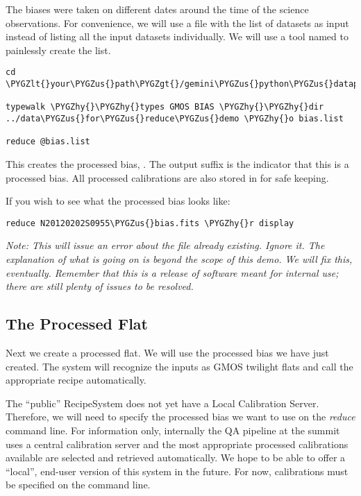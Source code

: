 \documentclass[letterpaper,10pt,english]{sphinxmanual}
\def\PYGZus{\char`\_}
\def\PYGZlt{\char`\<}
\def\PYGZgt{\char`\>}
\def\PYGZhy{\char`\-}
\begin{document}
The biases were taken on different dates
around the time of the science observations.  For convenience, we will use
a file with the list of datasets as input instead of listing all the input
datasets individually.  We will use a tool named  to painlessly
create the list.

\begin{Verbatim}[commandchars=\\\{\}]
cd \PYGZlt{}your\PYGZus{}path\PYGZgt{}/gemini\PYGZus{}python\PYGZus{}datapkg\PYGZhy{}X1/playground

typewalk \PYGZhy{}\PYGZhy{}types GMOS BIAS \PYGZhy{}\PYGZhy{}dir ../data\PYGZus{}for\PYGZus{}reduce\PYGZus{}demo \PYGZhy{}o bias.list

reduce @bias.list
\end{Verbatim}

This creates the processed bias, .  The output suffix
 is the indicator that this is a processed bias.  All processed calibrations
are also stored in  for safe keeping.

If you wish to see what the processed bias looks like:

\begin{Verbatim}[commandchars=\\\{\}]
reduce N20120202S0955\PYGZus{}bias.fits \PYGZhy{}r display
\end{Verbatim}

\emph{Note: This will issue an error about the file already existing.  Ignore it.
The explanation of what is going on is beyond the scope of this demo.  We
will fix this, eventually.  Remember that this is a release of software meant
for internal use; there are still plenty of issues to be resolved.}


\subsection{The Processed Flat}
\label{appendices/appendix_demo:the-processed-flat}
Next we create a processed flat.  We will use the processed bias we have
just created.  The system will recognize the inputs as GMOS twilight flats and
call the appropriate recipe automatically.

The ``public'' RecipeSystem does not yet have a Local Calibration Server.  Therefore,
we will need to specify the processed bias we want to use on the \emph{reduce} command
line.  For information only, internally the QA pipeline at the summit uses a
central calibration server and the most appropriate processed calibrations available
are selected and retrieved automatically.  We hope to be able to offer a ``local'',
end-user version of this system in the future.  For now, calibrations must be
specified on the command line.
\end{document}

